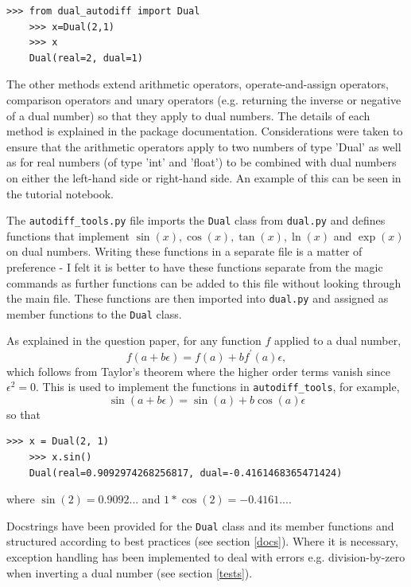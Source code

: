 \documentclass{article}
\begin{document}
\begin{lstlisting}[style=mypythonstyle]
    >>> from dual_autodiff import Dual
    >>> x=Dual(2,1)
    >>> x
    Dual(real=2, dual=1)
\end{lstlisting}

The other methods extend arithmetic operators, operate-and-assign operators, comparison operators and unary operators (e.g. returning the inverse or negative of a dual number) so that they apply to dual numbers. The details of each method is explained in the package documentation. Considerations were taken to ensure that the arithmetic operators apply to two numbers of type 'Dual' as well as for real numbers (of type 'int' and 'float') to be combined with dual numbers on either the left-hand side or right-hand side. An example of this can be seen in the tutorial notebook.

The \texttt{autodiff\_tools.py} file imports the \texttt{Dual} class from \texttt{dual.py} and defines functions that implement $\sin(x), \cos(x), \tan(x), \ln(x)$ and $\exp(x)$ on dual numbers. Writing these functions in a separate file is a matter of preference - I felt it is better to have these functions separate from the magic commands as further functions can be added to this file without looking through the main file. These functions are then imported into \texttt{dual.py} and assigned as member functions to the \texttt{Dual} class.

As explained in the question paper, for any function $f$ applied to a dual number,
\[
f(a+b\epsilon) = f(a) + b f^\prime (a) \epsilon,
\]
which follows from Taylor's theorem where the higher order terms vanish since $\epsilon^2 =0$. This is used to implement the functions in \texttt{autodiff\_tools}, for example, 
\[
\sin(a+b\epsilon) = \sin(a) + b \cos(a) \epsilon
\]
so that 
\begin{lstlisting}[style=mypythonstyle]
    >>> x = Dual(2, 1)
    >>> x.sin()
    Dual(real=0.9092974268256817, dual=-0.4161468365471424)
\end{lstlisting}
where $\sin(2)=0.9092...$ and $1*\cos(2)=-0.4161...$.

Docstrings have been provided for the \texttt{Dual} class and its member functions and structured according to best practices (see section \ref{docs}). Where it is necessary, exception handling has been implemented to deal with errors e.g. division-by-zero when inverting a dual number (see section \ref{tests}).
\end{document}
